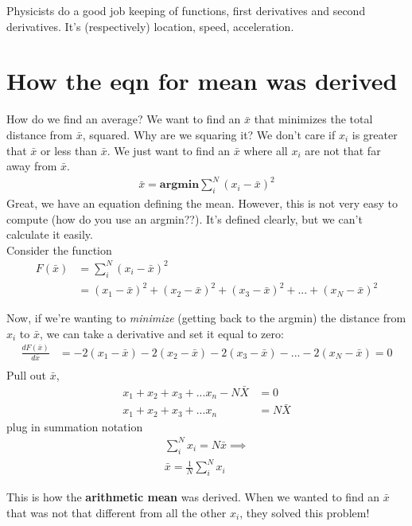 \documentclass{article}
\begin{document}
Physicists do a good job keeping of functions, first derivatives and second derivatives. It's (respectively) location, speed, acceleration. 

\section{How the eqn for mean was derived}
How do we find an average? We want to find an $\bar x$ that minimizes the total distance from $\bar x$, squared. Why are we squaring it? We don't care if $x_i$ is greater that $\bar x$ or less than $\bar x$. We just want to find an $\bar x$ where all $x_i$ are not that far away from $\bar x$. 
\begin{align} 
    \bar x = \textbf{argmin} \sum_i^N (x_i - \bar x) ^2
\end{align}
Great, we have an equation defining the mean. However, this is not very easy to compute (how do you use an argmin??). It's defined clearly, but we can't calculate it easily. \\

Consider the function 
\begin{align}
    F(\bar x) &= \sum_i^N (x_i - \bar x)^2\\
    &= (x_1 - \bar x)^2 + (x_2 - \bar x)^2  + (x_3 - \bar x)^2 +... + (x_N - \bar x)^2
\end{align}

Now, if we're wanting to \textit{minimize} (getting back to the argmin) the distance from $x_i$ to $\bar x$, we can take a derivative and set it equal to zero: 
\begin{align}
    \frac{d F(\bar x)}{d\bar x} &= -2(x_1 - \bar x)  -2(x_2 - \bar x) -2(x_3 - \bar x) - ... -2(x_N - \bar x) = 0\\
\end{align}
Pull out $\bar x$, 
\begin{align}
    x_1 + x_2 + x_3 + ... x_n - N \bar X &= 0\\
    x_1 + x_2 + x_3 + ... x_n &= N \bar X
\end{align}
plug in summation notation 
\begin{align}
    \sum_i^N x_i = N \bar x \implies \\
    \bar x = \frac{1}{N}\sum_i^N x_i
\end{align}

This is how the \textbf{arithmetic mean} was derived. When we wanted to find an $\bar x$ that was not that different from all the other $x_i$, they solved this problem! 
\end{document}
